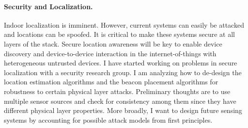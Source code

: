\documentclass[10pt]{article}
\begin{document}

\paragraph{Security and Localization. }
Indoor localization is imminent. However, current systems can easily be attacked and locations can be spoofed. It is critical to make these systems secure at all layers of the stack. Secure location awareness will be key to enable device discovery and device-to-device interaction in the internet-of-things with heterogeneous untrusted devices.
I have started working on problems in secure localization with a security research group. %
I am analyzing how to de-design the location estimation algorithms and the beacon placement algorithms for robustness to certain physical layer attacks. Preliminary thoughts are to use multiple sensor sources and check for consistency among them since they have different physical layer properties. More broadly, I want to design future sensing systems by accounting for possible attack models from first principles. %
\end{document}
